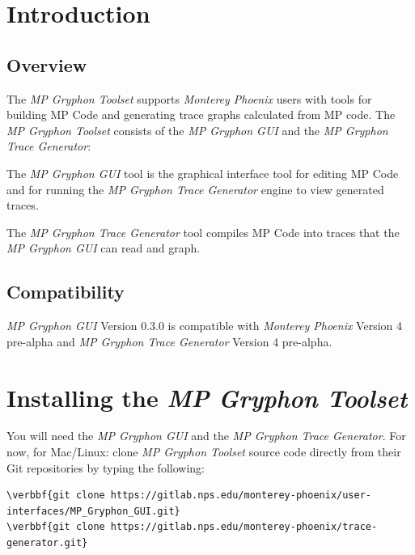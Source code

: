 \documentclass[11pt,fleqn]{article} %
\begin{document}
\newcommand \mpgt {\textit{MP Gryphon Toolset}\xspace}
\newcommand \ggui {\textit{MP Gryphon GUI}\xspace}
\newcommand \gtg {\textit{MP Gryphon Trace Generator}\xspace}
\newcommand \mphoenix {\textit{Monterey Phoenix}\xspace}





\setlength{\parindent}{0pt} %
\newpage
\thispagestyle{empty}
\mbox{}
\newpage

\tableofcontents
\newpage
{}
\newpage

\section{Introduction}
\label{intro}
\subsection {Overview}
The \mpgt supports \mphoenix users with tools for building MP Code and generating trace graphs calculated from MP code.
The \mpgt consists of the \ggui and the \gtg:\\
\begin{compactitem}
\item The \ggui tool is the graphical interface tool for editing MP Code and for running the \gtg engine to view generated traces.
\item The \gtg tool compiles MP Code into traces that the \ggui can read and graph.\\
\end{compactitem}

\subsection{Compatibility}
\ggui Version 0.3.0 is compatible with \mphoenix Version 4 pre-alpha and \gtg Version 4 pre-alpha.

\section{Installing the \mpgt}
You will need the \ggui and the \gtg.
For now, for Mac/Linux: clone \mpgt source code directly from their Git repositories by typing the following:
\begin{Verbatim}[commandchars=\\\{\}]
\verbbf{git clone https://gitlab.nps.edu/monterey-phoenix/user-interfaces/MP_Gryphon_GUI.git}
\verbbf{git clone https://gitlab.nps.edu/monterey-phoenix/trace-generator.git}
\end{Verbatim}
\end{document}
